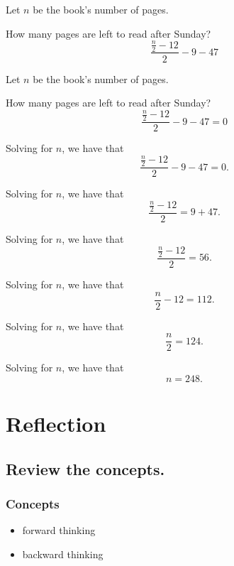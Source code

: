 \documentclass{beamer} %
\begin{document}
\begin{frame}
  Let $n$ be the book's number of pages.
  
  How many pages are left to read after Sunday?
  \[\frac{\frac{n}{2}-12}{2}-9-47\]
\end{frame}

\begin{frame}
  Let $n$ be the book's number of pages.
  
  How many pages are left to read after Sunday?
  \[\frac{\frac{n}{2}-12}{2}-9-47 = 0\]
\end{frame}

\begin{frame}
  Solving for $n$, we have that
  \[\frac{\frac{n}{2}-12}{2}-9-47 = 0.\]
\end{frame}

\begin{frame}
  Solving for $n$, we have that
  \[\frac{\frac{n}{2}-12}{2} = 9+47.\]
\end{frame}

\begin{frame}
  Solving for $n$, we have that
  \[\frac{\frac{n}{2}-12}{2} = 56.\]
\end{frame}

\begin{frame}
  Solving for $n$, we have that
  \[\frac{n}{2}-12 = 112.\]
\end{frame}

\begin{frame}
  Solving for $n$, we have that
  \[\frac{n}{2} = 124.\]
\end{frame}

\begin{frame}
  Solving for $n$, we have that
  \[n = \boxed{248}.\]
\end{frame}

\section{Reflection}

\subsection*{Review the concepts.}

\begin{frame}
  \frametitle{Concepts}
  \pause
  \begin{itemize}
    \item forward thinking
    \pause
    \item backward thinking
  \end{itemize}
\end{frame}
\end{document}
